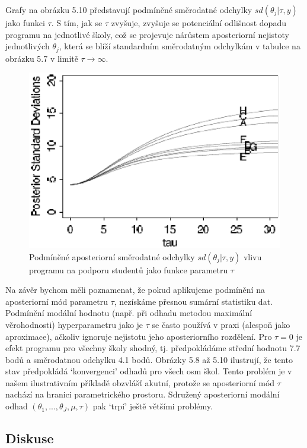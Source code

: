 Grafy na obrázku 5.10 představují podmíněné směrodatné odchylky $sd(\theta_j | \tau, y)$ jako funkci $\tau$. S tím, jak se $\tau$ zvyšuje, zvyšuje se potenciální odlišnost dopadu programu na jednotlivé školy, což se projevuje nárůstem aposteriorní nejistoty jednotlivých $\theta_j$, která se blíží standardním směrodatným odchylkám v tabulce na obrázku 5.7 v limitě $\tau \rightarrow \infty$.
\begin{figure}[htp]
\centering
\includegraphics[scale = 0.45]{pictures/fig_5_7.eps}
\caption{Podmíněné aposteriorní směrodatné odchylky $sd(\theta_j | \tau, y)$ vlivu programu na podporu studentů jako funkce parametru $\tau$}
\label{fig_5_7}
\end{figure}

Na závěr bychom měli poznamenat, že pokud aplikujeme podmínění na aposteriorní mód parametru $\tau$, nezískáme přesnou sumární statistiku dat. Podmínění modální hodnotu (např. při odhadu metodou maximální věrohodnosti) hyperparametru jako je $\tau$ se často používá v praxi (alespoň jako aproximace), ačkoliv ignoruje nejistotu jeho aposteriorního rozdělení. Pro $\tau = 0$ je efekt programu pro všechny školy shodný, tj. předpokládáme střední hodnotu 7.7 bodů a směrodatnou odchylku 4.1 bodů. Obrázky 5.8 až 5.10 ilustrují, že tento stav předpokládá `konvergenci' odhadů pro všech osm škol. Tento problém je v našem ilustrativním příkladě obzvlášť akutní, protože se aposteriorní mód $\tau$ nachází na hranici parametrického prostoru. Sdružený aposteriorní modální odhad $(\theta_1, ..., \theta_J, \mu, \tau)$ pak `trpí' ještě většími problémy.

\subsection{Diskuse}

